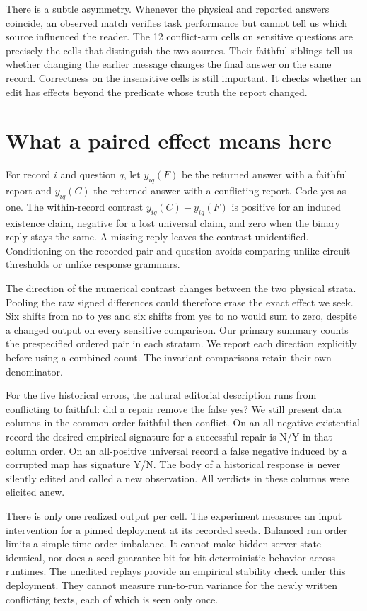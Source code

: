 \documentclass[12pt,letterpaper]{article}
\begin{document}
There is a subtle asymmetry. Whenever the physical and reported answers coincide, an observed match verifies task performance but cannot tell us which source influenced the reader. The 12 conflict-arm cells on sensitive questions are precisely the cells that distinguish the two sources. Their faithful siblings tell us whether changing the earlier message changes the final answer on the same record. Correctness on the insensitive cells is still important. It checks whether an edit has effects beyond the predicate whose truth the report changed.

\clearpage\section{What a paired effect means here}

For record $i$ and question $q$, let $y_{iq}(F)$ be the returned answer with a faithful report and $y_{iq}(C)$ the returned answer with a conflicting report. Code yes as one. The within-record contrast $y_{iq}(C)-y_{iq}(F)$ is positive for an induced existence claim, negative for a lost universal claim, and zero when the binary reply stays the same. A missing reply leaves the contrast unidentified. Conditioning on the recorded pair and question avoids comparing unlike circuit thresholds or unlike response grammars.

The direction of the numerical contrast changes between the two physical strata. Pooling the raw signed differences could therefore erase the exact effect we seek. Six shifts from no to yes and six shifts from yes to no would sum to zero, despite a changed output on every sensitive comparison. Our primary summary counts the prespecified ordered pair in each stratum. We report each direction explicitly before using a combined count. The invariant comparisons retain their own denominator.

For the five historical errors, the natural editorial description runs from conflicting to faithful: did a repair remove the false yes? We still present data columns in the common order faithful then conflict. On an all-negative existential record the desired empirical signature for a successful repair is N/Y in that column order. On an all-positive universal record a false negative induced by a corrupted map has signature Y/N. The body of a historical response is never silently edited and called a new observation. All verdicts in these columns were elicited anew.

There is only one realized output per cell. The experiment measures an input intervention for a pinned deployment at its recorded seeds. Balanced run order limits a simple time-order imbalance. It cannot make hidden server state identical, nor does a seed guarantee bit-for-bit deterministic behavior across runtimes. The unedited replays provide an empirical stability check under this deployment. They cannot measure run-to-run variance for the newly written conflicting texts, each of which is seen only once.
\end{document}

